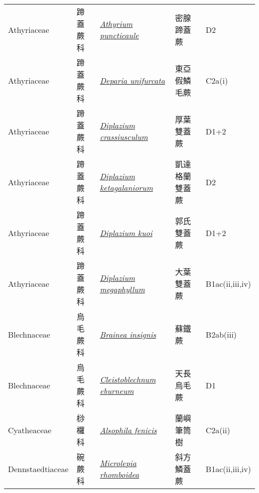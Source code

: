 {\begin{longtable}{p{2.5cm}p{2.5cm}p{4.5cm}p{2.5cm}p{3cm}}
    Athyriaceae & 蹄蓋蕨科 & \href{http://www.theplantlist.org/tpl1.1/search?q=Athyrium+puncticaule}{\textit{Athyrium puncticaule} } & 密腺蹄蓋蕨 & D2 \index{Athyrium@\textit{Athyrium}!puncticaule@\textit{puncticaule}}  \index{密腺蹄蓋蕨} \\
    Athyriaceae & 蹄蓋蕨科 & \href{http://www.theplantlist.org/tpl1.1/search?q=Deparia+unifurcata}{\textit{Deparia unifurcata} } & 東亞假鱗毛蕨 & C2a(i) \index{Deparia@\textit{Deparia}!unifurcata@\textit{unifurcata}}  \index{東亞假鱗毛蕨} \\
    Athyriaceae & 蹄蓋蕨科 & \href{http://www.theplantlist.org/tpl1.1/search?q=Diplazium+crassiusculum}{\textit{Diplazium crassiusculum} } & 厚葉雙蓋蕨 & D1+2 \index{Diplazium@\textit{Diplazium}!crassiusculum@\textit{crassiusculum}}  \index{厚葉雙蓋蕨} \\
    Athyriaceae & 蹄蓋蕨科 & \href{http://www.theplantlist.org/tpl1.1/search?q=Diplazium+ketagalaniorum}{\textit{Diplazium ketagalaniorum} } & 凱達格蘭雙蓋蕨 & D2 \index{Diplazium@\textit{Diplazium}!ketagalaniorum@\textit{ketagalaniorum}}  \index{凱達格蘭雙蓋蕨} \\
    Athyriaceae & 蹄蓋蕨科 & \href{http://www.theplantlist.org/tpl1.1/search?q=Diplazium+kuoi}{\textit{Diplazium kuoi} } & 郭氏雙蓋蕨 & D1+2 \index{Diplazium@\textit{Diplazium}!kuoi@\textit{kuoi}}  \index{郭氏雙蓋蕨} \\
    Athyriaceae & 蹄蓋蕨科 & \href{http://www.theplantlist.org/tpl1.1/search?q=Diplazium+megaphyllum}{\textit{Diplazium megaphyllum} } & 大葉雙蓋蕨 & B1ac(ii,iii,iv) \index{Diplazium@\textit{Diplazium}!megaphyllum@\textit{megaphyllum}}  \index{大葉雙蓋蕨} \\
    Blechnaceae & 烏毛蕨科 & \href{http://www.theplantlist.org/tpl1.1/search?q=Brainea+insignis}{\textit{Brainea insignis} } & 蘇鐵蕨 & B2ab(iii) \index{Brainea@\textit{Brainea}!insignis@\textit{insignis}}  \index{蘇鐵蕨} \\
    Blechnaceae & 烏毛蕨科 & \href{http://www.theplantlist.org/tpl1.1/search?q=Cleistoblechnum+eburneum}{\textit{Cleistoblechnum eburneum} } & 天長烏毛蕨 & D1 \index{Cleistoblechnum@\textit{Cleistoblechnum}!eburneum@\textit{eburneum}}  \index{天長烏毛蕨} \\
    Cyatheaceae & 桫欏科 & \href{http://www.theplantlist.org/tpl1.1/search?q=Alsophila+fenicis}{\textit{Alsophila fenicis} } & 蘭嶼筆筒樹 & C2a(ii) \index{Alsophila@\textit{Alsophila}!fenicis@\textit{fenicis}}  \index{蘭嶼筆筒樹} \\
    Dennstaedtiaceae & 碗蕨科 & \href{http://www.theplantlist.org/tpl1.1/search?q=Microlepia+rhomboidea}{\textit{Microlepia rhomboidea} } & 斜方鱗蓋蕨 & B1ac(ii,iii,iv) \index{Microlepia@\textit{Microlepia}!rhomboidea@\textit{rhomboidea}}  \index{斜方鱗蓋蕨} \\

\end{longtable}}

